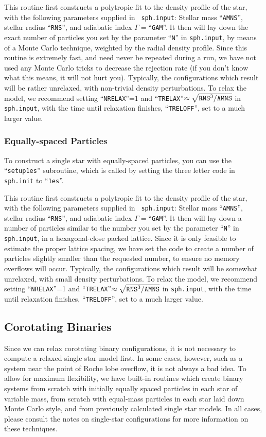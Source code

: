 This routine first constructs a polytropic fit to the density profile
of the star, with the following parameters supplied in {\tt
sph.input}: Stellar mass ``{\tt AMNS}'', stellar radius ``{\tt RNS}'',
and adiabatic index $\Gamma=$``{\tt GAM}''.
It then will lay down the exact number of particles you set by the
parameter ``{\tt N}'' in {\tt sph.input}, by means of a Monte Carlo
technique, weighted by the radial density profile.  Since this routine
is extremely fast, and need never be repeated during a run, we have
not used any Monte Carlo tricks to decrease the rejection rate (if you
don't know what this means, it will not hurt you).  Typically, the
configurations which result will be rather unrelaxed, with non-trivial
density perturbations.  To relax the model, we recommend setting
``{\tt NRELAX}''=1 and ``{\tt TRELAX}''$\approx\sqrt{{\tt
RNS}^3/{\tt AMNS}}$ in {\tt sph.input}, with the time until relaxation
finishes, ``{\tt TRELOFF}'', set to a much larger value.

\subsubsection{Equally-spaced Particles}
\label{in:1s:es}
To construct a single star with equally-spaced particles, you can use the
``{\tt setup1es}'' subroutine, which is called by setting the three
letter code in {\tt sph.init} to ``{\tt 1es}''.  

This routine first constructs a polytropic fit to the density profile
of the star, with the following parameters supplied in {\tt
sph.input}: Stellar mass ``{\tt AMNS}'', stellar radius ``{\tt RNS}'',
and adiabatic index $\Gamma=$``{\tt GAM}''.
It then will lay down a number of particles similar to the number you
set by the 
parameter ``{\tt N}'' in {\tt sph.input}, in a hexagonal-close packed
lattice.  Since it is only feasible to estimate the proper lattice
spacing, we have set the code to create a number of particles slightly
smaller than the requested number, to ensure no memory overflows will occur.
Typically, the
configurations which result will be somewhat unrelaxed, with small
density perturbations.  To relax the model, we recommend setting
``{\tt NRELAX}''=1 and ``{\tt TRELAX}''$\approx\sqrt{{\tt
RNS}^3/{\tt AMNS}}$ in {\tt sph.input}, with the time until relaxation
finishes, ``{\tt TRELOFF}'', set to a much larger value.

\subsection{Corotating Binaries}
\label{in:2c}
Since we can relax corotating binary configurations, it is not
necessary to compute a relaxed single star model first.  In some
cases, however, such as a system near the point of Roche lobe
overflow, it is not always a bad idea.  To allow for maximum
flexibility, we have built-in routines which create binary systems
from scratch with initially equally spaced particles in each star of
variable mass, from scratch with equal-mass particles in each star
laid down Monte Carlo style, and from previously calculated single
star models.  In all cases, please consult the notes on single-star
configurations for more information on these techniques.

